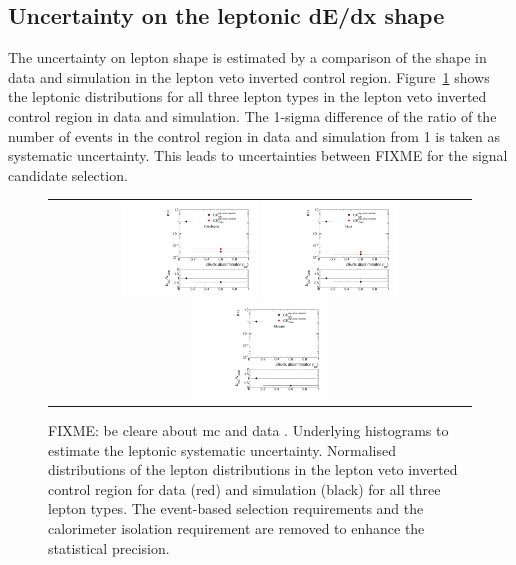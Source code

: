 \subsection{Uncertainty on the leptonic dE/dx shape}
\label{sec:LeptonIasUncertainty}

The uncertainty on lepton \ias shape is estimated by a comparison of the \ias shape in data and simulation in the lepton veto inverted control region.
Figure~\ref{fig:LeptonIasUnc} shows the leptonic \ias distributions for all three lepton types in the lepton veto inverted control region in data and simulation.
The 1-sigma difference of the ratio of the number of events in the control region in data and simulation from 1 is taken as systematic uncertainty.
This leads to uncertainties between FIXME for the signal candidate selection.
\begin{figure}[!h]
  \centering 
  \begin{tabular}{c}
    \includegraphics[width=0.33\textwidth]{figures/analysis/Background/hASmi_SRbinning_Electrons_MCCR_DataCR.pdf}
    \includegraphics[width=0.33\textwidth]{figures/analysis/Background/hASmi_SRbinning_Taus_MCCR_DataCR.pdf}
    \includegraphics[width=0.33\textwidth]{figures/analysis/Background/hASmi_SRbinning_Muons_MCCR_DataCR.pdf}
  \end{tabular}
  \caption{FIXME: be cleare about mc and data . Underlying histograms to estimate the leptonic \ias systematic uncertainty. Normalised distributions of the lepton \ias distributions in the lepton veto inverted control region for data (red) and simulation (black) for all three lepton types. The event-based selection requirements and the calorimeter isolation requirement are removed to enhance the statistical precision.}
  \label{fig:LeptonIasUnc}
\end{figure}

